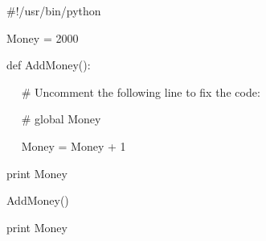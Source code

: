 \documentclass[a4paper,12pt]{report}
\begin{document}
 \hspace*{0.5in}  $  \#  $!/usr/bin/python \par
\vspace{12pt}
\noindent 
 \hspace*{0.5in} Money = 2000 \par
\noindent 
 \hspace*{0.5in} def AddMoney(): \par
\noindent 
 \hspace*{0.5in} ~~  $  \#  $ Uncomment the following line to fix the code: \par
\noindent 
 \hspace*{0.5in} ~~  $  \#  $ global Money \par
\noindent 
 \hspace*{0.5in} ~~ Money = Money + 1 \par
\vspace{12pt}
\noindent 
 \hspace*{0.5in} print Money \par
\noindent 
 \hspace*{0.5in} AddMoney() \par
\noindent 
 \hspace*{0.5in} print Money \par
\vspace{20pt}
\end{document}
